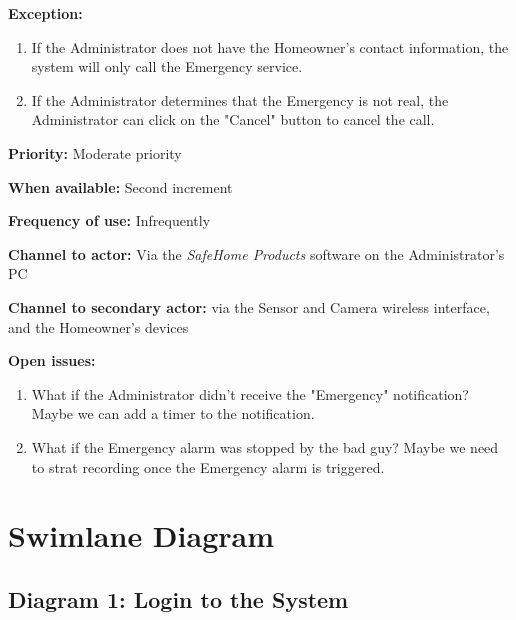 \documentclass[twoside,11pt]{article}
\begin{document}
\begin{center}
{{\begin{multicols}{2}
                \textbf{Exception:}

                \begin{enumerate}
                    \item If the Administrator does not have the Homeowner's contact information, the system will only call the Emergency service.
                    \item If the Administrator determines that the Emergency is not real, the Administrator can click on the "Cancel" button to cancel the call.
                \end{enumerate}

                \textbf{Priority:} Moderate priority

                \textbf{When available:} Second increment

                \textbf{Frequency of use:} Infrequently

                \textbf{Channel to actor:} Via the \emph{SafeHome Products} software on the Administrator's PC

                \textbf{Channel to secondary actor:} via the Sensor and Camera wireless interface, and the Homeowner's devices

                \textbf{Open issues:}

                \begin{enumerate}
                    \item What if the Administrator didn't receive the "Emergency" notification? Maybe we can add a timer to the notification.
                    \item What if the Emergency alarm was stopped by the bad guy? Maybe we need to strat recording once the Emergency alarm is triggered.
                \end{enumerate}

            \end{multicols}}}
\end{center}
\newpage

\section{Swimlane Diagram}
\fontsize{11}{12}\selectfont

\subsection{Diagram 1: Login to the System}
\end{document}
